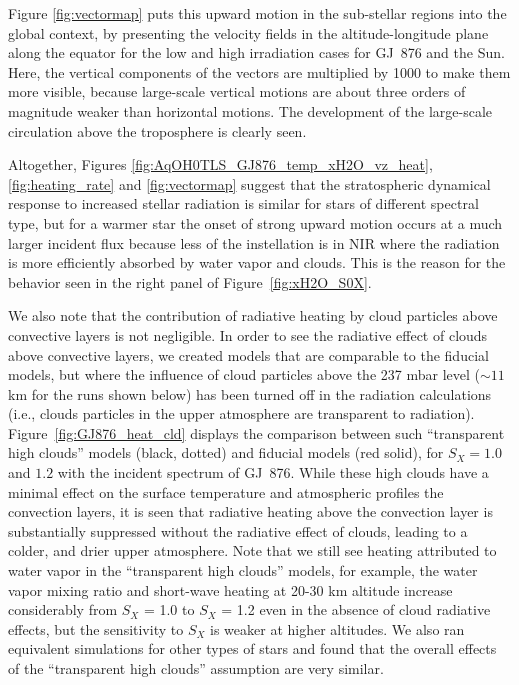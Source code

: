 \documentclass[11pt,numberedappendix,twocolappendix,]{emulateapj}
\def\wv{water vapor}
\def\revise#1{{\color{red}{#1}}}
\begin{document}
Figure \ref{fig:vectormap} puts this upward motion in the sub-stellar regions into the global context, by presenting the velocity fields in the altitude-longitude plane along the equator for the low and high irradiation cases for GJ~876 and the Sun. %
Here, the vertical components of the vectors are multiplied by 1000 to make them more visible, because large-scale vertical motions are about three orders of magnitude weaker than horizontal motions. %
The development of the large-scale circulation above the troposphere is clearly seen. 

Altogether, Figures \ref{fig:AqOH0TLS_GJ876_temp_xH2O_vz_heat}, \ref{fig:heating_rate} and \ref{fig:vectormap} suggest that the stratospheric dynamical response to increased stellar radiation is similar for stars of different spectral type, but for a warmer star the onset of strong upward motion occurs at a much larger incident flux because less of the instellation is in NIR where the radiation is more efficiently absorbed by \wv{} and clouds. %
This is the reason for the behavior seen in the right panel of Figure~\ref{fig:xH2O_S0X}. 

We also note that the contribution of radiative heating by cloud particles above convective layers is not negligible. 
In order to see the radiative effect of clouds above convective layers, we created models that are comparable to the fiducial models, but where the  influence of cloud particles above the 237 mbar level ($\sim 11$ km for the runs shown below) has been turned off in the radiation calculations (i.e., clouds particles in the upper atmosphere are transparent to radiation). 
Figure~\ref{fig:GJ876_heat_cld} displays the comparison between such ``transparent high clouds'' models (black, dotted) and fiducial models (red solid), for $S_X=1.0$ and $1.2$ with the incident spectrum of GJ~876. 
While these high clouds have a minimal effect on the surface temperature and atmospheric profiles \revise{in} the convection layers, it is seen that radiative heating above the convection layer is substantially suppressed without the radiative effect of clouds, leading to a colder, and drier upper atmosphere. 
Note that we still see heating attributed to water vapor in the ``transparent high clouds'' models, for example, the \wv{} mixing ratio and short-wave heating at 20-30 km altitude increase considerably from $S_X$ = 1.0 to $S_X$ = 1.2 even in the absence of cloud radiative effects, but the sensitivity to $S_X$ is weaker at higher altitudes. 
We also ran equivalent simulations for other types of stars and found that the overall effects of the ``transparent high clouds'' assumption are very similar. 
\end{document}
